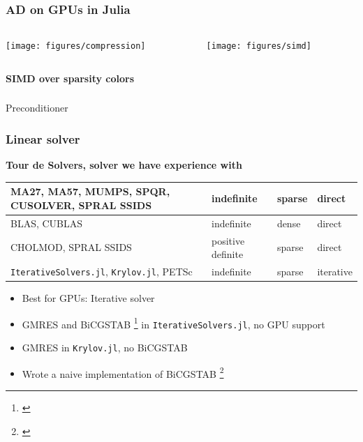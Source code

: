 \begin{frame}
  \frametitle{AD on GPUs in Julia}
  \begin{columns}[T]
    \begin{column}{0.35\textwidth}
      \begin{center}
        \vspace{0.2cm}
        \texttt{[image: figures/compression]}
      \end{center}
    \end{column}
    \begin{column}{0.6\textwidth}
      \begin{center}
        \texttt{[image: figures/simd]}
      \end{center}
    \end{column}
  \end{columns}
  \begin{center}
  \end{center}
  {\bf SIMD over sparsity colors}
\end{frame}

\begin{frame}
  \frametitle{}
  \centering
  {\Huge Preconditioner}
\end{frame}

\begin{frame}
  \frametitle{Linear solver}
  {\bf Tour de Solvers, solver we have experience with}
  \begin{table}
  \begin{tabular}{p{5cm}|lll}
    MA27, MA57, MUMPS, SPQR, CUSOLVER, SPRAL SSIDS & indefinite & sparse & direct \\
    \hline
    BLAS, CUBLAS & indefinite & dense  & direct \\
    \hline
    CHOLMOD, SPRAL SSIDS& positive definite & sparse & direct \\
    \hline
    \lstinline{IterativeSolvers.jl}, \lstinline{Krylov.jl}, PETSc & indefinite & sparse & iterative \\ 
  \end{tabular}
\end{table}
  \begin{itemize}
    \item Best for GPUs: Iterative solver
    \item GMRES and BiCGSTAB \footnote{\cite{sleijpen1993bicgstab}} in \lstinline{IterativeSolvers.jl}, no GPU support 
    \item GMRES in \lstinline{Krylov.jl}, no BiCGSTAB 
    \item Wrote a naive implementation of BiCGSTAB \footnote{\cite{bicgstabVorst}}
  \end{itemize}
\end{frame}

